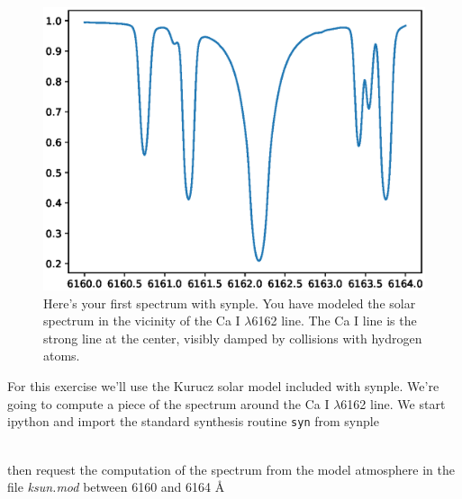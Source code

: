 \documentclass[]{article}
\begin{document}
\begin{figure}[t!]
\centering
\includegraphics[width=14cm]{Figure_1.ps}
\caption{Here's your first spectrum with synple. You have modeled the solar spectrum in the vicinity of the Ca I $\lambda$6162 line. The Ca I line is the strong line at the center, visibly damped by collisions with hydrogen atoms.
\label{first}
}
\end{figure}


For this exercise we'll use the Kurucz solar model included with synple. We're going to compute a piece of the spectrum around the Ca I $\lambda$6162 line. We start ipython and import the standard synthesis routine {\tt syn} from synple
\\
\\

\noindent then request the computation of the spectrum from the model atmosphere in the file {\it ksun.mod} between 6160 and 6164 \AA\
\\
\\
\end{document}
